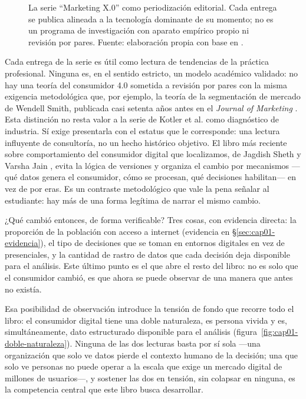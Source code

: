\begin{figure}[htbp]
  \centering
  
  \caption{La serie \enquote{Marketing X.0} como periodización editorial. Cada
  entrega se publica alineada a la tecnología dominante de su momento; no es
  un programa de investigación con aparato empírico propio ni revisión por
  pares. Fuente: elaboración propia con base en
  \parencite{kotler2021marketing50,kotler2024marketing6}.}
  \label{fig:cap01-lineamx0}
\end{figure}

Cada entrega de la serie es útil como lectura de tendencias de la práctica
profesional. Ninguna es, en el sentido estricto, un modelo académico
validado: no hay una teoría del consumidor 4.0 sometida a revisión por pares
con la misma exigencia metodológica que, por ejemplo, la teoría de la
segmentación de mercado de Wendell Smith, publicada casi setenta años antes
en el \textit{Journal of Marketing} \parencite{smith1956}. Esta distinción no
resta valor a la serie de Kotler et al. como diagnóstico de industria. Sí
exige presentarla con el estatus que le corresponde: una lectura influyente
de consultoría, no un hecho histórico objetivo. El libro más reciente sobre
comportamiento del consumidor digital que localizamos, de Jagdish Sheth y
Varsha Jain \parencite{sheth2026}, evita la lógica de versiones y organiza el
cambio por mecanismos —qué datos genera el consumidor, cómo se procesan, qué
decisiones habilitan— en vez de por eras. Es un contraste metodológico que
vale la pena señalar al estudiante: hay más de una forma legítima de narrar
el mismo cambio.

¿Qué cambió entonces, de forma verificable? Tres cosas, con evidencia
directa: la proporción de la población con acceso a internet (evidencia en
\S\ref{sec:cap01-evidencia}), el tipo de decisiones que se toman en entornos
digitales en vez de presenciales, y la cantidad de rastro de datos que cada
decisión deja disponible para el análisis. Este último punto es el que abre
el resto del libro: no es solo que el consumidor cambió, es que ahora se
puede observar de una manera que antes no existía.

Esa posibilidad de observación introduce la tensión de fondo que recorre
todo el libro: el consumidor digital tiene una doble naturaleza, es persona
vivida y es, simultáneamente, dato estructurado disponible para el análisis
(figura~\ref{fig:cap01-doble-naturaleza}). Ninguna de las dos lecturas basta
por sí sola —una organización que solo ve datos pierde el contexto humano de
la decisión; una que solo ve personas no puede operar a la escala que exige
un mercado digital de millones de usuarios—, y sostener las dos en tensión,
sin colapsar en ninguna, es la competencia central que este libro busca
desarrollar.

